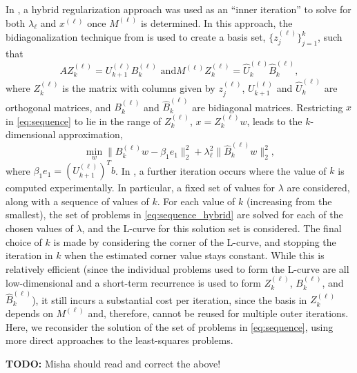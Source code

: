 In \cite{Gazzola_etal_2020}, a hybrid regularization approach
\cite{Kilmer_Hanson_Espanol_2007} was used as an ``inner iteration''
to solve for both $\lambda_\ell$ and $x^{(\ell)}$ once $M^{(\ell)}$ is
determined.  In this approach, the bidiagonalization technique from
\cite{Kilmer_Hanson_Espanol_2007} is used to create a basis set,
$\{z^{(\ell)}_j\}_{j=1}^k$, such that
\[
AZ_k^{(\ell)} = U_{k+1}^{(\ell)}B_k^{(\ell)} \text{ and
}M^{(\ell)}Z_k^{(\ell)} = \hat{U}_k^{(\ell)}\hat{B}_k^{(\ell)},
\]
where $Z_k^{(\ell)}$ is the matrix with columns given by
$z^{(\ell)}_j$, $U_{k+1}^{(\ell)}$ and $\hat{U}_k^{(\ell)}$ are
orthogonal matrices, and $B_k^{(\ell)}$ and $\hat{B}_k^{(\ell)}$ are
bidiagonal matrices.  Restricting $x$ in \eqref{eq:sequence} to lie in
the range of $Z_k^{(\ell)}$, $x = Z_k^{(\ell)}w$, leads to the
$k$-dimensional approximation,
\begin{equation}
  \label{eq:sequence_hybrid}
\min_{w} \| B_k^{(\ell)}w - \beta_1 e_1 \|_2^2 + \lambda_\ell^2 \| \hat{B}_k^{(\ell)} w \|_2^2,
\end{equation}
where $\beta_1 e_1 = \left(U_{k+1}^{(\ell)}\right)^Tb$.  In
\cite{Gazzola_etal_2020}, a further iteration occurs where the value
of $k$ is computed experimentally.  In particular, a fixed set of values for
$\lambda$ are considered, along with a sequence of values of $k$.  For
each value of $k$ (increasing from the smallest), the set of problems
in \eqref{eq:sequence_hybrid} are solved for each of the chosen values
of $\lambda$, and the L-curve for this solution set is considered.  The
final choice of $k$ is made by considering the corner of the L-curve,
and stopping the iteration in $k$ when the estimated corner value
stays constant.  While this is relatively efficient (since the
individual problems used to form the L-curve are all low-dimensional
and a short-term recurrence is used to form $Z_k^{(\ell)}$,
$B_k^{(\ell)}$, and $\hat{B}_k^{(\ell)}$), it still incurs a
substantial cost per iteration, since the basis in $Z_k^{(\ell)}$
depends on $M^{(\ell)}$ and, therefore, cannot be reused for multiple
outer iterations.  Here, we reconsider the solution of the set of
problems in \eqref{eq:sequence}, using more direct approaches to the
least-squares problems.

{\bf TODO:} Misha should read and correct the above!

